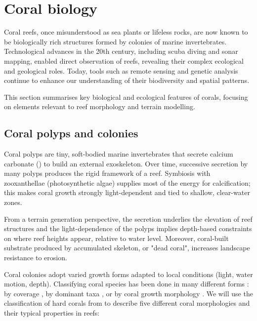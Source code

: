 \section{Coral biology}
\label{sec:state-of-the-art_biology}

Coral reefs, once misunderstood as sea plants or lifeless rocks, are now known to be biologically rich structures formed by colonies of marine invertebrates. Technological advances in the 20th century, including scuba diving and sonar mapping, enabled direct observation of reefs, revealing their complex ecological and geological roles. Today, tools such as remote sensing and genetic analysis continue to enhance our understanding of their biodiversity and spatial patterns.

This section summarises key biological and ecological features of corals, focusing on elements relevant to reef morphology and terrain modelling.

\subsection{Coral polyps and colonies}
Coral polyps are tiny, soft-bodied marine invertebrates that secrete calcium carbonate () to build an external exoskeleton. Over time, successive secretion by many polyps produces the rigid framework of a reef. Symbiosis with zooxanthellae (photosynthetic algae) supplies most of the energy for calcification; this makes coral growth strongly light-dependent and tied to shallow, clear-water zones.

From a terrain generation perspective, the  secretion underlies the elevation of reef structures and the light-dependence of the polyps implies depth-based constraints on where reef heights appear, relative to water level. Moreover, coral-built substrate produced by accumulated skeleton, or "dead coral", increases landscape resistance to erosion.

Coral colonies adopt varied growth forms adapted to local conditions (light, water motion, depth). Classifying coral species has been done in many different forms \cite{Kovacs2020}: by coverage \cite{Kuchler1986, Bauer2009, Purkis2019}, by dominant taxa \cite{Stoddart1969}, or by coral growth morphology \cite{Mumby1999,Goltenboth2006}. We will use the classification of hard corals from \cite{Goltenboth2006} to describe five different coral morphologies and their typical properties in reefs:

